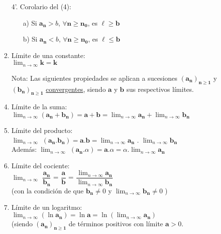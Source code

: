 \documentclass[a4paper,11pt]{report}
\begin{document}
\begin{itemize}
\begin{enumerate}
\begin{itemize}
\end{itemize}
\item[4'.] Corolario del (4): \\
\begin{itemize}
\item[a)] Si $\mathbf{a_n} > b$, $\forall \mathbf{n} \geqslant \mathbf{n_0}$, es $\ell \geqslant \mathbf{b}$
\item[b)] Si $\mathbf{a_n} < b$, $\forall \mathbf{n} \geqslant \mathbf{n_0}$, es $\ell \leqslant \mathbf{b}$
\end{itemize}
\item Límite de una constante: \\
$\displaystyle \lim_{n\to\infty} \mathbf{k} = \mathbf{k}$
\item[Nota:] Las siguientes propiedades se aplican a sucesiones  $\mathbf{(a_n)_{n \geqslant 1}}$ y $\mathbf{(b_n)_{n \geqslant 1}}$ \underline{convergentes}, siendo $\mathbf{a}$ y $\mathbf{b}$ sus respectivos límites.
\item Límite de la suma: \\[5pt]
$\displaystyle \lim_{n\to\infty} (\mathbf{a_n} + \mathbf{b_n}) = \mathbf{a} + \mathbf{b} = \lim_{n\to\infty} \mathbf{a_n} + \lim_{n\to\infty} \mathbf{b_n}$
\item Límite del producto: \\[5pt]
$\displaystyle \lim_{n\to\infty}$ $(\mathbf{a_n} .  \mathbf{b_n})  = \mathbf{a}.\mathbf{b} = \displaystyle \lim_{n\to\infty} \mathbf{a_n}$ . $\displaystyle \lim_{n\to\infty} \mathbf{b_n}$ \\[4pt]
Además: $\displaystyle \lim_{n\to\infty}$ $(\mathbf{a_n} .  \alpha)  = \mathbf{a}.\alpha = \alpha. \displaystyle \lim_{n\to\infty} \mathbf{a_n}$
\item Límite del cociente: \\[5pt]
$\displaystyle \lim_{n\to\infty}$ $\dfrac{\mathbf{a_n}}{\mathbf{b_n}}$ = $\dfrac{\mathbf{a}}{\mathbf{b}}$ = $ \dfrac{\displaystyle \lim_{n\to\infty} \mathbf{a_n}}{\displaystyle \lim_{n\to\infty} \mathbf{b_n}}$ \\
(con la condición de que $\mathbf{b_n} \neq 0$ y $ \displaystyle \lim_{n\to\infty} \mathbf{b_n} \neq 0$ )
\item Límite de un logaritmo: \\[5pt]
$\displaystyle \lim_{n\to\infty} (\ln \mathbf{a_n}) = \ln \mathbf{a} = \ln (\lim_{n\to\infty} \mathbf{a_n})$ \\[4pt]
(siendo $\mathbf{(a_n)_{n \geqslant 1}}$ de términos positivos con límite $\mathbf{a} > 0$. \\

\end{enumerate}
\end{itemize}
\end{document}
